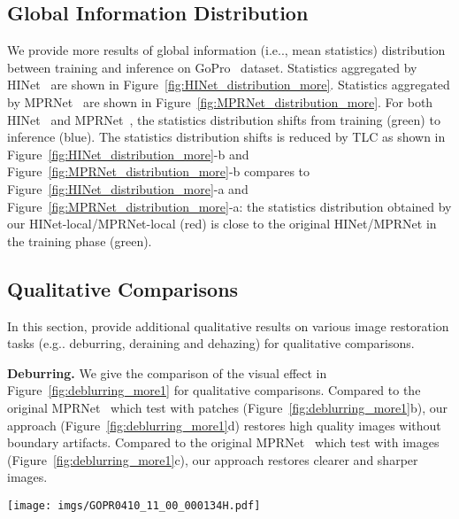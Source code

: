 \documentclass[runningheads]{llncs}
\makeatletter
\DeclareRobustCommand\onedot{\futurelet\@let@token\@onedot}
\def\@onedot{\ifx\@let@token.\else.\null\fi\xspace}
\def\eg{e.g\onedot}
\def\ie{i.e\onedot}
\makeatother
\begin{document}
\subsection{Global Information Distribution} \label{sec:statistics}
We provide more results of global information (\ie, mean statistics) distribution between training and inference on GoPro~\cite{nah2017deep} dataset. 
Statistics aggregated by HINet~\cite{chen2021hinet} are shown in Figure~\ref{fig:HINet_distribution_more}. 
Statistics aggregated by MPRNet~\cite{Zamir2021MPRNet} are shown in Figure~\ref{fig:MPRNet_distribution_more}. 
For both HINet~\cite{chen2021hinet} and MPRNet~\cite{Zamir2021MPRNet}, the statistics distribution shifts from training (green) to inference (blue). 
The statistics distribution shifts is reduced by TLC as shown in Figure~\ref{fig:HINet_distribution_more}-b and Figure~\ref{fig:MPRNet_distribution_more}-b compares to Figure~\ref{fig:HINet_distribution_more}-a and Figure~\ref{fig:MPRNet_distribution_more}-a: the statistics distribution obtained by our HINet-local/MPRNet-local (red) is close to the original HINet/MPRNet in the training phase (green).
 


\subsection{Qualitative Comparisons} \label{sec:qualitative}
In this section, provide additional qualitative results on various image restoration tasks (\eg deburring, deraining and dehazing) for qualitative comparisons.



\noindent\textbf{Deburring.}
We give the comparison of the visual effect in Figure~\ref{fig:deblurring_more1} for qualitative comparisons. 
Compared to the original MPRNet~\cite{zamir2021multi} which test with patches (Figure~\ref{fig:deblurring_more1}b), our approach (Figure~\ref{fig:deblurring_more1}d) restores high quality images without boundary artifacts.
Compared to the original MPRNet~\cite{zamir2021multi} which test with images (Figure~\ref{fig:deblurring_more1}c), our approach restores clearer and sharper images.

\begin{figure*}[]
\centering
\texttt{[image: imgs/GOPR0410\_11\_00\_000134H.pdf]}
\caption{
Deblurring results of MPRNet~\cite{zamir2021multi} on GoPro~\cite{nah2017deep} generated by different inference schemes. 
\textbf{Left}: full-images. \textbf{Right}: crops from left image.
(b) Test with patches;
(c) Test with images;
(d) Test with images and TLC is adopted ({ours}). 
It illustrates that (d) provides sharper results than (c) while avoids the boundary artifacts in (b).
}
\label{fig:deblurring_more1}
\end{figure*}
\end{document}
